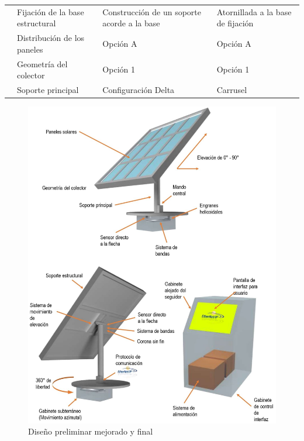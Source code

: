 \begin{table}[H]
\begin{tabular}{@{}|p{2cm}|p{4cm}|p{3.5cm}|p{3.5cm}|}
		\cline{2-4} & Fijación de la base estructural & Construcción de un soporte acorde a la base & Atornillada a la base de fijación \\ 
		\cline{2-4} & Distribución de los paneles & Opción A & Opción A \\ 
		\cline{2-4} & Geometría del colector & Opción 1 & Opción 1\\ 
		\cline{2-4} & Soporte principal & Configuración Delta & Carrusel 
		\\ \hline %
	\end{tabular}
	\label{tabla:morfologico_mejorado}
\end{table}

\begin{figure}[H]
	\centering
	\includegraphics[width=\columnwidth]{imagenes/DCmejorado}
	\caption{Diseño preliminar mejorado y final}
	\label{fig:DCbest}
\end{figure}

\endinput